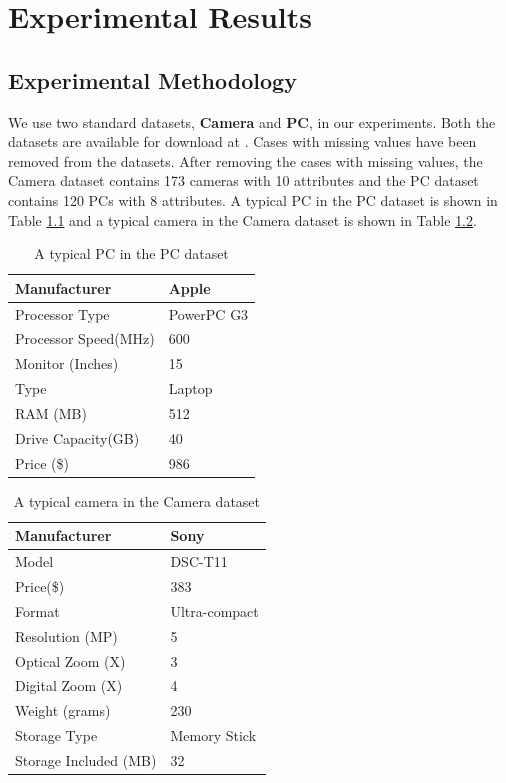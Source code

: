 \chapter{Experimental Results}
\label{chap:results}
\section{Experimental Methodology}


We use two standard datasets, \textbf{Camera} and \textbf{PC}, in our experiments.
Both the datasets are available for download at \cite{datasets}.
Cases with missing values have been removed from the datasets.
After removing the cases with missing values, the Camera dataset contains 173 cameras with 10 attributes and the PC dataset contains 120 PCs with 8 attributes.
A typical PC in the PC dataset is shown in Table \ref{tab:pc} and a typical camera in the Camera dataset is shown in Table \ref{tab:camera}.


\begin{table}
\caption{A typical PC in the PC dataset}
\centering
\renewcommand{\arraystretch}{1.2}
\label{tab:pc}

\begin{tabular}{|l|l|}
\hline
Manufacturer & Apple \\
\hline
Processor Type & PowerPC G3 \\
\hline
Processor Speed(MHz) & 600 \\
\hline
Monitor (Inches) & 15 \\
\hline
Type & Laptop \\ 
\hline
RAM (MB) & 512 \\
\hline
Drive Capacity(GB) & 40 \\
\hline
Price (\$) & 986\\
\hline
\end{tabular}
\end{table}

\begin{table}
\caption{A typical camera in the Camera dataset}
\centering
\renewcommand{\arraystretch}{1.2}
\label{tab:camera}

\begin{tabular}{|l|l|}
\hline
Manufacturer & Sony \\
\hline
Model & DSC-T11 \\
\hline
Price(\$) & 383\\
\hline
Format & Ultra-compact\\
\hline
Resolution (MP)  &5\\
\hline
Optical Zoom (X) &3 \\
\hline
Digital Zoom (X) &4\\
\hline
Weight (grams) &230\\
\hline
Storage Type & Memory Stick\\
\hline
Storage Included (MB)& 32\\
\hline
\end{tabular}
\end{table}


